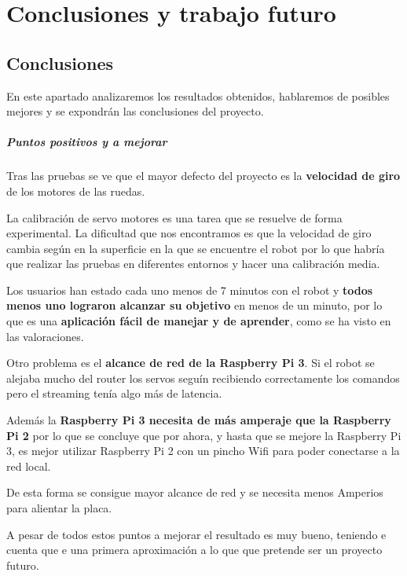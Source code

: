 \documentclass[twoside, 11pt]{epstfg}
\begin{document}
\chapter{Conclusiones y trabajo futuro}
\label{chap:conclusiones}
\vspace{-0.2cm}

\section{Conclusiones}
En este apartado analizaremos los resultados obtenidos, hablaremos de posibles mejores y se expondrán las conclusiones del proyecto.

\paragraph{Puntos positivos y a mejorar}

Tras las pruebas se ve que el mayor defecto del proyecto es la \textbf{velocidad de giro} de los motores de las ruedas.

La calibración de servo motores es una tarea que se resuelve de forma experimental. La dificultad que nos encontramos es que la velocidad de giro cambia según en la superficie en la que se encuentre el robot por lo que habría que realizar las pruebas en diferentes entornos y hacer una calibración media.

Los usuarios han estado cada uno menos de 7 minutos con el robot y \textbf{todos menos uno lograron alcanzar su objetivo} en menos de un minuto, por lo que es una \textbf{aplicación fácil de manejar y de aprender}, como se ha visto en las valoraciones.

Otro problema es el \textbf{alcance de red de la Raspberry Pi 3}. Si el robot se alejaba mucho del router los servos seguín recibiendo correctamente los comandos pero el streaming tenía algo más de latencia.

Además la \textbf{Raspberry Pi 3 necesita de más amperaje que la Raspberry Pi 2} por lo que se concluye que por ahora, y hasta que se mejore la Raspberry Pi 3, es mejor utilizar Raspberry Pi 2 con un pincho Wifi para poder conectarse a la red local.

De esta forma se consigue mayor alcance de red y se necesita menos Amperios para alientar la placa.

A pesar de todos estos puntos a mejorar el resultado es muy bueno, teniendo e cuenta que e una primera aproximación a lo que que pretende ser un proyecto futuro.
\end{document}
